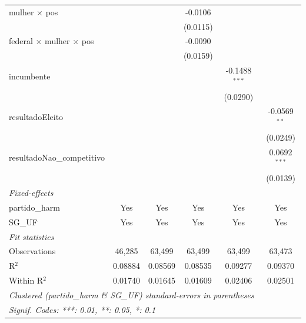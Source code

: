 \begin{tabular}{lccccc}
   mulher $\times$ pos                        &                       &                 & -0.0106         &                    &   \\   
                                              &                       &                 & (0.0115)        &                    &   \\   
   federal $\times$ mulher $\times$ pos       &                       &                 & -0.0090         &                    &   \\   
                                              &                       &                 & (0.0159)        &                    &   \\   
   incumbente                                 &                       &                 &                 & -0.1488$^{***}$    &   \\   
                                              &                       &                 &                 & (0.0290)           &   \\   
   resultadoEleito                            &                       &                 &                 &                    & -0.0569$^{**}$\\   
                                              &                       &                 &                 &                    & (0.0249)\\   
   resultadoNao\_competitivo                  &                       &                 &                 &                    & 0.0692$^{***}$\\   
                                              &                       &                 &                 &                    & (0.0139)\\   
   \midrule
   \emph{Fixed-effects}\\
   partido\_harm                              & Yes                   & Yes             & Yes             & Yes                & Yes\\  
   SG\_UF                                     & Yes                   & Yes             & Yes             & Yes                & Yes\\  
   \midrule
   \emph{Fit statistics}\\
   Observations                               & 46,285                & 63,499          & 63,499          & 63,499             & 63,473\\  
   R$^2$                                      & 0.08884               & 0.08569         & 0.08535         & 0.09277            & 0.09370\\  
   Within R$^2$                               & 0.01740               & 0.01645         & 0.01609         & 0.02406            & 0.02501\\  
   \midrule \midrule
   \multicolumn{6}{l}{\emph{Clustered (partido\_harm \& SG\_UF) standard-errors in parentheses}}\\
   \multicolumn{6}{l}{\emph{Signif. Codes: ***: 0.01, **: 0.05, *: 0.1}}\\
\end{tabular}
\par\endgroup


